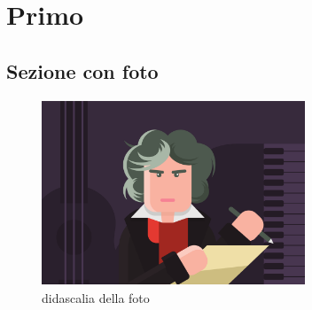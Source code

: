 \chapter{Primo}
\pagestyle{fancy}


\lipsum[1-2]

\section{Sezione con foto}


\lipsum[15]

\begin{center}

\begin{figure}[h]
   \centering 
 \includegraphics[width=0.7\textwidth]{img/beethoven.pdf}
 \caption{didascalia della foto}
\label{fig: beethoven}
\end{figure}

\end{center}